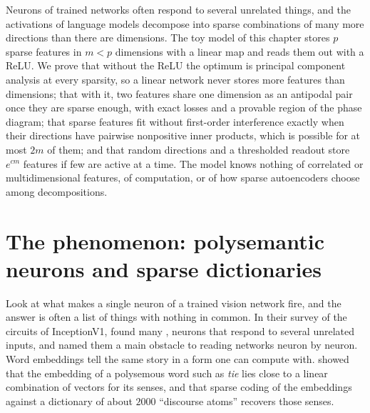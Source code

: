 \newcommand{\supv}{v(S)}
\newcommand{\supOmega}{\Omega}
\newcommand{\supD}{\mathrm{D}}

\begin{refsection}

\begin{chaptersummary}
Neurons of trained networks often respond to several unrelated things, and the activations of language models decompose into sparse combinations of many more directions than there are dimensions. The toy model of this chapter stores $p$ sparse features in $m<p$ dimensions with a linear map and reads them out with a ReLU. We prove that without the ReLU the optimum is principal component analysis at every sparsity, so a linear network never stores more features than dimensions; that with it, two features share one dimension as an antipodal pair once they are sparse enough, with exact losses and a provable region of the phase diagram; that sparse features fit without first-order interference exactly when their directions have pairwise nonpositive inner products, which is possible for at most $2m$ of them; and that random directions and a thresholded readout store $e^{cm}$ features if few are active at a time. The model knows nothing of correlated or multidimensional features, of computation, or of how sparse autoencoders choose among decompositions.
\end{chaptersummary}

\section{The phenomenon: polysemantic neurons and sparse dictionaries}\label{sec:superposition:phenomenon}

Look at what makes a single neuron of a trained vision network fire, and the answer is often a list of things with nothing in common. In their survey of the circuits of InceptionV1, \textcite{OlahEtAl2020} found many , neurons that respond to several unrelated inputs, and named them a main obstacle to reading networks neuron by neuron. Word embeddings tell the same story in a form one can compute with. \Textcite{AroraEtAl2018} showed that the embedding of a polysemous word such as \emph{tie} lies close to a linear combination of vectors for its senses, and that sparse coding of the embeddings against a dictionary of about $2000$ ``discourse atoms'' recovers those senses.


\end{refsection}

